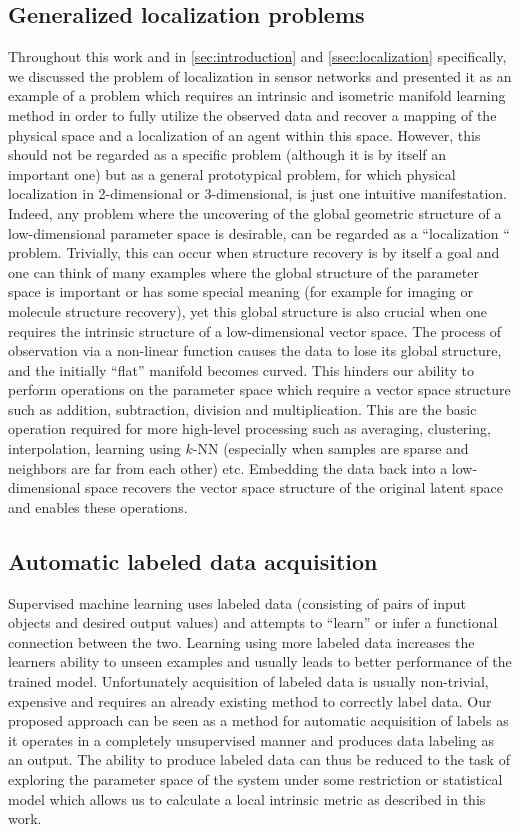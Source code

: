 	
	\subsection{Generalized localization problems}
	
	Throughout this work and in \cref{sec:introduction} and
	\cref{ssec:localization} specifically, we discussed the problem
	of localization in sensor networks and presented it as an example
	of a problem which requires an intrinsic and isometric manifold learning
	method in order to fully utilize the observed data and recover a mapping
	of the physical space and a localization of an agent within this space.
	However, this should not be regarded as a specific problem (although
	it is by itself an important one) but as a general prototypical problem,
	for which physical localization in 2-dimensional or 3-dimensional,
	is just one intuitive manifestation. Indeed, any problem where the
	uncovering of the global geometric structure of a low-dimensional
	parameter space is desirable, can be regarded as a ``localization
	`` problem. Trivially, this can occur when structure recovery is
	by itself a goal and one can think of many examples where the global
	structure of the parameter space is important or has some special
	meaning (for example for imaging or molecule structure recovery),
	yet this global structure is also crucial when one requires the intrinsic
	structure of a low-dimensional vector space. The process of observation
	via a non-linear function causes the data to lose its global structure,
	and the initially ``flat'' manifold becomes curved. This hinders
	our ability to perform operations on the parameter space which require
	a vector space structure such as addition, subtraction, division and
	multiplication. This are the basic operation required for more high-level
	processing such as averaging, clustering, interpolation, learning
	using $k$-NN (especially when samples are sparse and neighbors are
	far from each other) etc. Embedding the data back into a low-dimensional
	space recovers the vector space structure of the original latent space
	and enables these operations.
	
	\subsection{Automatic labeled data acquisition}
	
	Supervised machine learning uses labeled data (consisting of pairs
	of input objects and desired output values) and attempts to ``learn''
	or infer a functional connection between the two. Learning using more
	labeled data increases the learners ability to unseen examples and
	usually leads to better performance of the trained model. Unfortunately
	acquisition of labeled data is usually non-trivial, expensive and
	requires an already existing method to correctly label data. Our proposed
	approach can be seen as a method for automatic acquisition of labels
	as it operates in a completely unsupervised manner and produces data
	labeling as an output. The ability to produce labeled data can thus
	be reduced to the task of exploring the parameter space of the system
	under some restriction or statistical model which allows us to calculate
	a local intrinsic metric as described in this work. 
	
